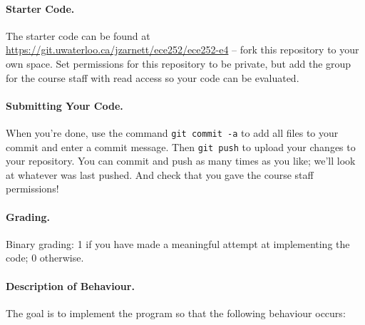 \paragraph{Starter Code.} The starter code can be found at \url{https://git.uwaterloo.ca/jzarnett/ece252/ece252-e4} -- fork this repository to your own space. Set permissions for this repository to be private, but add the group for the course staff with read access so your code can be evaluated.

\paragraph{Submitting Your Code.} When you're done, use the command \texttt{git commit -a} to add all files to your commit and enter a commit message. Then \texttt{git push} to upload your changes to your repository. You can commit and push as many times as you like; we'll look at whatever was last pushed. And check that you gave the course staff permissions!

\paragraph{Grading.} Binary grading: 1 if you have made a meaningful attempt at implementing the code; 0 otherwise.

\paragraph{Description of Behaviour.} The goal is to implement the program so that the following behaviour occurs:

